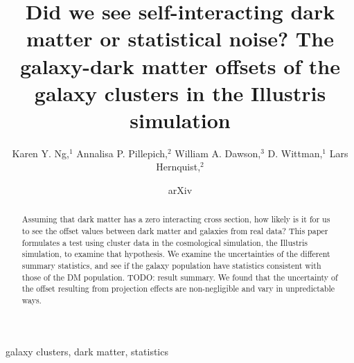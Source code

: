 \documentclass[usenatbib]{mn2e}
\title[
	Did we see self-interacting dark matter or statistical noise?]
{Did we see self-interacting dark matter or statistical noise? The galaxy-dark
	matter offsets of the galaxy clusters
	in the Illustris simulation}
\author[Karen Y. Ng et al.]{Karen Y. Ng,$^{1}$
	Annalisa P. Pillepich,$^{2}$ 
	William A. Dawson,$^{3}$ 
	D. Wittman,$^{1}$
	\newauthor Lars Hernquist,$^{2}$
}
\begin{document}
\date{arXiv} \pagerange{\pageref{firstpage}--\pageref{lastpage}}
 \maketitle\label{firstpage}
\begin{abstract} 
	Assuming that dark matter has a zero interacting cross section, how likely is
	it for us to see the offset values between dark matter and galaxies 
	from real data? 
	This paper formulates a test using cluster data in the cosmological 
	simulation, the Illustris simulation, to examine that hypothesis. 
	We examine the uncertainties of the different summary statistics, and see
	if the galaxy population have statistics consistent with those of the DM
	population. TODO: result summary.
	We found that the uncertainty of the offset resulting from projection effects 
	are non-negligible and vary in unpredictable ways. 
\end{abstract}

\begin{keywords}
	galaxy clusters, dark matter, statistics 
\end{keywords}





\appendix


\clearpage\bsp\label{lastpage} 
\end{document}
